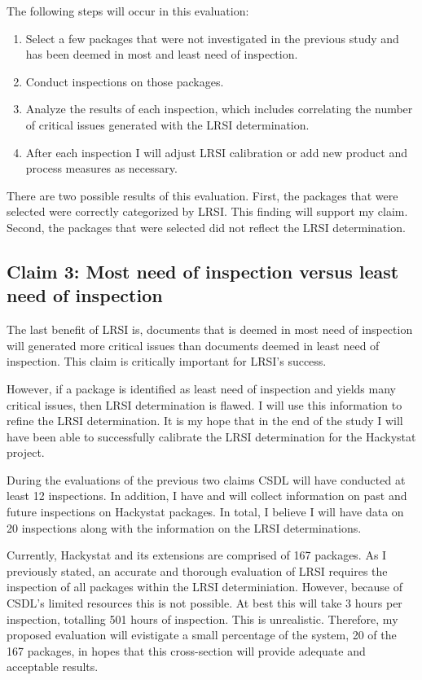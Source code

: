 The following steps will occur in this evaluation:
\begin{enumerate}
\item Select a few packages that were not investigated in the previous
  study and has been deemed in most and least need of inspection. 
\item Conduct inspections on those packages. 
\item Analyze the results of each inspection, which includes correlating
  the number of critical issues generated with the LRSI determination. 
\item After each inspection I will adjust LRSI calibration or add new
  product and process measures as necessary.
\end{enumerate}

There are two possible results of this evaluation. First, the packages that
were selected were correctly categorized by LRSI. This finding will support
my claim. Second, the packages that were selected did not reflect the LRSI
determination.




\subsection{Claim 3: Most need of inspection versus least need of inspection}
\label{sec:claim3}
The last benefit of LRSI is, documents that is deemed in most need of
inspection will generated more critical issues than documents deemed in
least need of inspection.  This claim is critically important for LRSI's
success.

However, if a package is identified as least need of inspection and yields
many critical issues, then LRSI determination is flawed. I will use this
information to refine the LRSI determination. It is my hope that in the end
of the study I will have been able to successfully calibrate the LRSI
determination for the Hackystat project.

During the evaluations of the previous two claims CSDL will have conducted
at least 12 inspections.  In addition, I have and will collect information
on past and future inspections on Hackystat packages. In total, I believe I
will have data on 20 inspections along with the information on the LRSI
determinations. 

Currently, Hackystat and its extensions are comprised of 167 packages. As I
previously stated, an accurate and thorough evaluation of LRSI requires the
inspection of all packages within the LRSI determiniation. However, because
of CSDL's limited resources this is not possible. At best this will take 3
hours per inspection, totalling 501 hours of inspection. This is
unrealistic.  Therefore, my proposed evaluation will evistigate a small
percentage of the system, 20 of the 167 packages, in hopes that this
cross-section will provide adequate and acceptable results.

